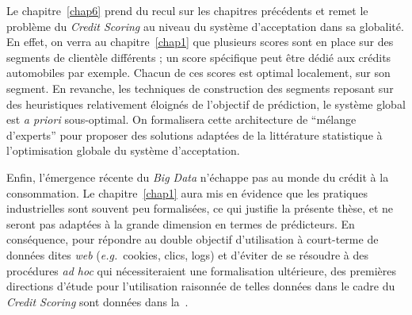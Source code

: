 Le chapitre~\ref{chap6} prend du recul sur les chapitres précédents et remet le problème du \textit{Credit Scoring} au niveau du système d'acceptation dans sa globalité. En effet, on verra au chapitre~\ref{chap1} que plusieurs scores sont en place sur des segments de clientèle différents ; un score spécifique peut être dédié aux crédits automobiles par exemple. Chacun de ces scores est optimal localement, sur son segment. En revanche, les techniques de construction des segments reposant sur des heuristiques relativement éloignés de l'objectif de prédiction, le système global est \textit{a priori} sous-optimal. On formalisera cette architecture de ``mélange d'experts'' pour proposer des solutions adaptées de la littérature statistique à l'optimisation globale du système d'acceptation.

Enfin, l'émergence récente du \textit{Big Data} n'échappe pas au monde du crédit à la consommation. Le chapitre~\ref{chap1} aura mis en évidence que les pratiques industrielles sont souvent peu formalisées, ce qui justifie la présente thèse, et ne seront pas adaptées à la grande dimension en termes de prédicteurs. En conséquence, pour répondre au double objectif d'utilisation à court-terme de données dites \textit{web} (\textit{e.g.}\ cookies, clics, logs) et d'éviter de se résoudre à des procédures \textit{ad hoc} qui nécessiteraient une formalisation ultérieure, des premières directions d'étude pour l'utilisation raisonnée de telles données dans le cadre du \textit{Credit Scoring} sont données dans la~.

\printbibliography[heading=subbibliography, title=Références de l'introduction]